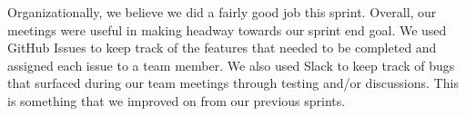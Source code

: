 \documentclass{article}
\begin{document}
\par Organizationally, we believe we did a fairly good job this sprint. Overall, our meetings were useful in making headway towards our sprint end goal. We used GitHub Issues to keep track of the features that needed to be completed and assigned each issue to a team member. We also used Slack to keep track of bugs that surfaced during our team meetings through testing and/or discussions. This is something that we improved on from our previous sprints.
\end{document}
